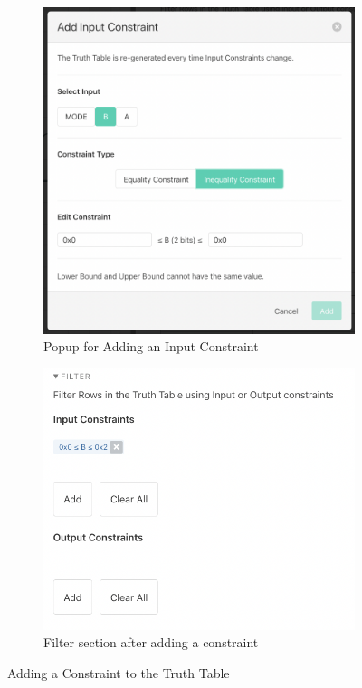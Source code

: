 \begin{figure}[h]
     \centering
     \begin{subfigure}[b]{0.4\textwidth}
         \centering
         \includegraphics[width=\textwidth]{04.AnalysisDesign/constraintadder.png}
         \caption{Popup for Adding an Input Constraint}
         \label{fig:addconstraint}
     \end{subfigure}
     \begin{subfigure}[b]{0.4\textwidth}
         \centering
         \includegraphics[width=\textwidth]{04.AnalysisDesign/tabwithconstraint.png}
         \caption{Filter section after adding a constraint}
         \label{fig:tabwithconstraint}
     \end{subfigure}
        \caption{Adding a Constraint to the Truth Table}
        \label{fig:constraintadd}
\end{figure}

